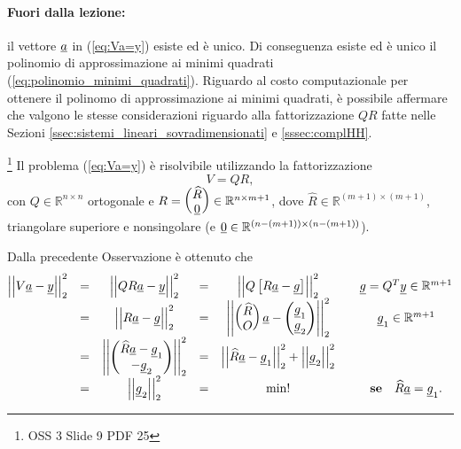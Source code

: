 \paragraph{Fuori dalla lezione:} il vettore $\uline a$ in (\ref{eq:Va=y}) esiste ed è unico. Di conseguenza esiste ed è unico il polinomio di approssimazione ai minimi quadrati (\ref{eq:polinomio_minimi_quadrati}). Riguardo al costo computazionale per ottenere il polinomo di approssimazione ai minimi quadrati, è possibile affermare che valgono le stesse considerazioni riguardo alla fattorizzazione $QR$ fatte nelle Sezioni \ref{ssec:sistemi_lineari_sovradimensionati} e \ref{sssec:complHH}.

\begin{remark}
    \footnote{OSS 3 Slide 9 PDF 25} Il problema (\ref{eq:Va=y}) è risolvibile utilizzando la fattorizzazione
    \begin{equation*}
    	V=QR,
    \end{equation*}
    con $Q\in\mathbb R^{n\times n}$ ortogonale e $R=\begin{pmatrix}\widehat R\\ \uline 0\end{pmatrix}\in\mathbb R^{n\times m+1}$, dove $\widehat R\in\mathbb R^{(m+1)\times (m+1)}$, triangolare superiore e nonsingolare (e $\uline 0 \in \mathbb{R}^{(n-(m+1))\times (n-(m+1))}$).
\end{remark}

Dalla precedente Osservazione è ottenuto che
\begin{equation*}
	\begin{matrix}
		\left|\left|V \uline a - \uline y\right|\right|^2_2 &=& \left|\left|QR\uline a - \uline y\right|\right|^2_2 &=& \left|\left|Q\left[R\uline a -  \uline g\right]\right|\right|_2^2 && \uline g = Q^T\uline y\in\mathbb{R}^{m+1}\\
		&=&\left|\left|R\uline a -\uline g\right|\right|_2^2 &=& 
		\left|\left|\begin{pmatrix}
			\widehat{R}\\
			O
		\end{pmatrix}\uline a -
		\begin{pmatrix}
			\uline g_1\\
			\uline g_2
		\end{pmatrix}\right|\right|_2^2 && \uline g_1\in\mathbb{R}^{m+1}\\
		&=& \left|\left| \begin{pmatrix}
			\widehat{R}\uline a - \uline g_1\\
			- \uline g_2
		\end{pmatrix}\right|\right|_2^2 &=& \left|\left|\widehat{R}\uline a - \uline g_1 \right|\right|_2^2 + \left|\left|\uline g_2\right|\right|_2^2\\
		&=& \left|\left|\uline g_2\right|\right|_2^2 &=& \min! &&  \text{\textbf{se}}\quad \widehat{R} \uline a = \uline g_1.
	\end{matrix}
\end{equation*}

